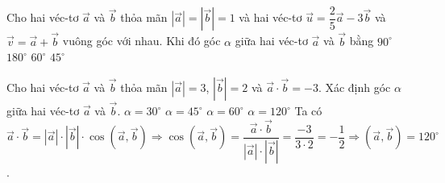 \begin{ex}%
Cho hai véc-tơ $\overrightarrow{a}$ và $\overrightarrow{b}$ thỏa mãn $\left|\overrightarrow{a}\right|=\left|\overrightarrow{b}\right|=1$ và hai véc-tơ $\overrightarrow{u}=\dfrac{2}{5}\overrightarrow{a}-3\overrightarrow{b}$ và $\overrightarrow{v}=\overrightarrow{a}+\overrightarrow{b}$ vuông góc với nhau. Khi đó góc $\alpha$ giữa hai véc-tơ $\overrightarrow{a}$ và $\overrightarrow{b}$ bằng
\choice
{$90^\circ$}
{\True $180^\circ$}
{$60^\circ$}
{$45^\circ$}
\end{ex}

\begin{ex}%
Cho hai véc-tơ $\vec{a}$ và $\vec{b}$ thỏa mãn $\left| \vec{a} \right|=3$, $\left| \vec{b} \right|=2$ và $\vec{a}\cdot\vec{b}=-3$. Xác định góc $\alpha $ giữa hai véc-tơ $\vec{a}$ và $\vec{b}$.
\choice
{$\alpha =30^\circ$}
{$\alpha =45^\circ$}
{$\alpha =60^\circ$}
{\True $\alpha =120^\circ$}
\loigiai
{Ta có $\vec{a}\cdot\vec{b}=\left| \vec{a} \right|\cdot \left| \vec{b} \right|\cdot \cos(\vec{a},\vec{b} )\Rightarrow\cos(\vec{a},\vec{b} )=\dfrac{\vec{a}\cdot\vec{b}}{\left| {\vec{a}} \right|\cdot\left| \vec{b} \right|}=\dfrac{-3}{3\cdot2}=-\dfrac{1}{2}\Rightarrow(\vec{a},\vec{b} )=120^\circ$.}
\end{ex}

